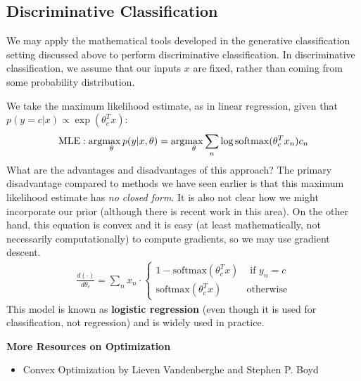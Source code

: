 \documentclass{article}
\begin{document}
\subsection{Discriminative Classification}
We may apply the mathematical tools developed in the generative classification setting discussed above to perform discriminative classification. In discriminative classification, we assume that our inputs $x$ are fixed, rather than coming from some probability distribution.

We take the maximum likelihood estimate, as in linear regression, given that $p(y = c | x) \propto \exp(\theta_c^T x)$: 
$$ \operatorname{MLE}: \arg\!\max_{\theta} p(y | x, \theta) = \arg\!\max_{\theta} \sum_n \log \operatorname{softmax} (\theta_c^T x_n) c_n $$
What are the advantages and disadvantages of this approach? The primary disadvantage compared to methods we have seen earlier is that this maximum likelihood estimate has \textit{no closed form}. It is also not clear how we might incorporate our prior (although there is recent work in this area). On the other hand, this equation is convex and it is easy (at least mathematically, not necessarily computationally) to compute gradients, so we may use gradient descent. 
\begin{align} 
    \frac{d (\cdot)}{d \theta_c} = \sum_n x_n \cdot \begin{cases} 1 - \text{softmax}(\theta_c ^T x) & \text{ if } y_n = c \\ \text{softmax}(\theta_c ^T x) & \text{otherwise} \end{cases} 
\end{align}
This model is known as \textbf{logistic regression} (even though it is used for classification, not regression) and is widely used in practice.

\medskip

\textbf{More Resources on Optimization}
\begin{itemize}
    \item Convex Optimization by Lieven Vandenberghe and Stephen P. Boyd
\end{itemize}
\end{document}

